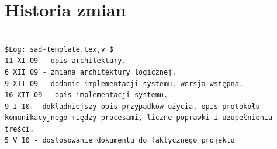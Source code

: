 \documentclass[12pt,a4paper,twoside]{article}
\begin{document}






\section{Historia zmian}

\begin{verbatim}

$Log: sad-template.tex,v $
11 XI 09 - opis architektury.
6 XII 09 - zmiana architektury logicznej.
9 XII 09 - dodanie implementacji systemu, wersja wstępna.
16 XII 09 - opis implementacji systemu.
9 I 10 - dokładniejszy opis przypadków użycia, opis protokołu 
komunikacyjnego między procesami, liczne poprawki i uzupełnienia treści.
5 V 10 - dostosowanie dokumentu do faktycznego projektu

\end{verbatim}
\end{document}
